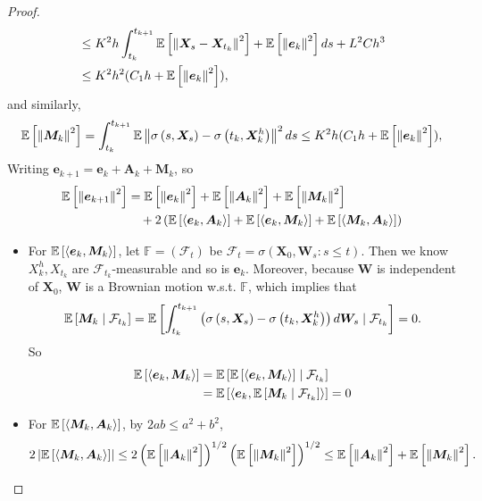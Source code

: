 \begin{proof}
\begin{align*}
        &\leq K^2h\int_{t_k}^{t_{k+1}} \mathbb{E}\left[\left\lVert\bm{X}_s - \bm{X}_{t_k}\right\lVert^2\right] + \mathbb{E}\left[\left\lVert\bm{e}_k\right\lVert^2\right] ds + L^2Ch^3 \\
        &\leq K^2h^2(C_1h + \mathbb{E}\left[\left\lVert\bm{e}_k\right\lVert^2\right]),
    \end{align*}
    and similarly,
    \begin{equation*}
        \mathbb{E}\left[\left\lVert\bm{M}_k\right\lVert^2\right] = \int_{t_k}^{t_{k+1}} \mathbb{E}\left\lVert\sigma\left(s,\bm{X}_s\right)-\sigma\left(t_k,\bm{X}_k^h\right)\right\lVert^2 ds \leq K^2h(C_1h + \mathbb{E}\left[\left\lVert\bm{e}_k\right\lVert^2\right]),
    \end{equation*}
    Writing $\bm{e}_{k+1} = \bm{e}_k + \bm{A}_k + \bm{M}_k$, so
    \begin{align*}
        \mathbb{E}\left[\left\lVert\bm{e}_{k+1}\right\lVert^2\right] &= \mathbb{E}\left[\left\lVert\bm{e}_{k}\right\lVert^2\right] + \mathbb{E}\left[\left\lVert\bm{A}_{k}\right\lVert^2\right] + \mathbb{E}\left[\left\lVert\bm{M}_{k}\right\lVert^2\right] \\
        &\quad + 2\left(\mathbb{E}\left[\left\langle \bm{e}_k,\bm{A}_k \right\rangle\right] + \mathbb{E}\left[\left\langle \bm{e}_k,\bm{M}_k \right\rangle\right] + \mathbb{E}\left[\left\langle \bm{M}_k,\bm{A}_k \right\rangle\right]\right)
    \end{align*}
    \begin{itemize}
        \item For $\mathbb{E}\left[\left\langle \bm{e}_k,\bm{M}_k \right\rangle\right]$, let $\mathbb{F} = (\mathcal{F}_t)$ be $\mathcal{F}_t = \sigma(\bm{X}_0,\bm{W}_s \colon s \leq t)$. Then we know $X^h_k,X_{t_k}$ are $\mathcal{F}_{t_k}$-measurable and so is $\bm{e}_k$. Moreover, because $\bm{W}$ is independent of $\bm{X}_0$, $\bm{W}$ is a Brownian motion w.s.t. $\mathbb{F}$, which implies that
        \begin{equation*}
            \mathbb{E}\left[\bm{M}_k \mid \mathcal{F}_{t_k}\right] = \mathbb{E}\left[ \int_{t_k}^{t_{k+1}}\left(\sigma\left(s,\bm{X}_s\right)-\sigma\left(t_k,\bm{X}_k^h\right)\right) d \bm{W}_s \mid \mathcal{F}_{t_k}\right] = 0.
        \end{equation*}
         So
        \begin{align*}
            \mathbb{E}\left[\left\langle \bm{e}_k,\bm{M}_k \right\rangle\right] & = \mathbb{E}\left[\mathbb{E}\left[\left\langle \bm{e}_k,\bm{M}_k \right\rangle\right] \mid \mathcal{F}_{t_k}\right] \\
            &= \mathbb{E}\left[ \left\langle  \bm{e}_k, \mathbb{E}\left[ \bm{M}_k \mid \mathcal{F}_{t_k} \right]  \right\rangle \right] = 0
        \end{align*}

        \item For $\mathbb{E}\left[\left\langle \bm{M}_k,\bm{A}_k \right\rangle\right]$, by $2ab \leq a^2 + b^2$,
        \begin{equation*}
            2\left\lvert\mathbb{E}\left[\left\langle \bm{M}_k,\bm{A}_k \right\rangle\right]\right\lvert \leq 2\left(\mathbb{E}\left[\left\lVert\bm{A}_k\right\lVert^2\right]\right)^{1/2}\left(\mathbb{E}\left[\left\lVert\bm{M}_k\right\lVert^2\right]\right)^{1/2} \leq \mathbb{E}\left[\left\lVert\bm{A}_k\right\lVert^2\right] + \mathbb{E}\left[\left\lVert\bm{M}_k\right\lVert^2\right].
        \end{equation*}


\end{itemize}
\end{proof}
